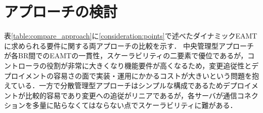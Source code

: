 \section{アプローチの検討}
\label{consideration:summary}

\begin{table}[h]
    \caption{各アプローチの比較}
    \label{table:compare_approach}
    \centering
\end{table}

表\ref{table:compare_approach}に\ref{consideration:points}で述べたダイナミックEAMTに求められる要件に関する両アプローチの比較を示す．
中央管理型アプローチが各BR間でのEAMTの一貫性，スケーラビリティの二要素で優位であるが，コントローラの役割が非常に大きくなり機能要件が高くなるため，変更追従性とデプロイメントの容易さの面で実装・運用にかかるコストが大きいという問題を抱えている．一方で分散管理型アプローチはシンプルな構成であるためデプロイメントが比較的容易であり変更への追従がリニアであるが，各サーバが通信コネクションを多量に貼らなくてはならない点でスケーラビリティに難がある．


